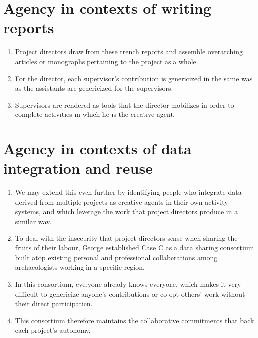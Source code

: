 \documentclass[12pt]{article}
\begin{document}
\section{Agency in contexts of writing reports}
\begin{enumerate}
  \item Project directors draw from these trench reports and assemble overarching articles or monographs pertaining to the project as a whole.
  \item For the director, each supervisor's contribution is genericized in the same was as the assistants are genericized for the supervisors.
  \item Supervisors are rendered as tools that the director mobilizes in order to complete activities in which he is the creative agent.
\end{enumerate}

\section{Agency in contexts of data integration and reuse}
\begin{enumerate}
  \item We may extend this even further by identifying people who integrate data derived from multiple projects as creative agents in their own activity systems, and which leverage the work that project directors produce in a similar way.
  \item To deal with the insecurity that project directors sense when sharing the fruits of their labour, George established Case C as a data sharing consortium built atop existing personal and professional collaborations among archaeologists working in a specific region.
  \item In this consortium, everyone already knows everyone, which makes it very difficult to genericize anyone's contributions or co-opt others' work without their direct participation.
  \item This consortium therefore maintains the collaborative commitments that back each project's autonomy.
\end{enumerate}
\end{document}
